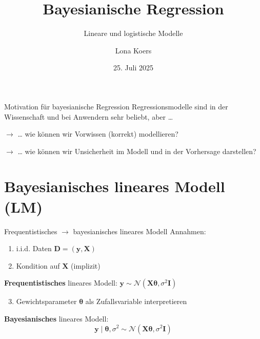 \documentclass[
  ignorenonframetext,
  aspectratio=169,
]{beamer}
\title{Bayesianische Regression}
\subtitle{Lineare und logistische Modelle}
\author{Lona Koers}
\date{25. Juli 2025}
\institute{LMU}
\providecommand{\tightlist}{%
  \setlength{\itemsep}{0pt}\setlength{\parskip}{0pt}}
\newcommand{\by}{\bm{y}}
\newcommand{\bD}{\bm{D}}
\newcommand{\bI}{\bm{I}}
\newcommand{\bX}{\bm{X}}
\newcommand{\Ncal}{\mathcal{N}}
\newcommand{\ssd}{\sigma^2}
\newcommand{\btheta}{\bm{\theta}}
\begin{document}
\frame{\titlepage}

\begin{frame}{Motivation für bayesianische Regression}
\protect{}\label{motivation-fuxfcr-bayesianische-regression}
Regressionsmodelle sind in der Wissenschaft und bei Anwendern sehr
beliebt, aber \ldots{}

\vspace{0.5cm}

\(\to\) \ldots{} wie können wir Vorwissen (korrekt) modellieren?

\(\to\) \ldots{} wie können wir Unsicherheit im Modell und in der
Vorhersage darstellen?
\end{frame}

\section{\texorpdfstring{Bayesianisches \textbf{lineares} Modell
(LM)}{Bayesianisches lineares Modell (LM)}}\label{bayesianisches-lineares-modell-lm}

\begin{frame}{Frequentistisches \(\to\) bayesianisches lineares Modell}
\protect{}\label{frequentistisches-to-bayesianisches-lineares-modell}
Annahmen:

\begin{enumerate}
\tightlist
\item
  i.i.d. Daten \(\bD = (\by, \bX)\)
\item
  Kondition auf \(\bX\) (implizit)
\end{enumerate}

\textbf{Frequentistisches} lineares Modell:
\(\by \sim \Ncal(\bX \btheta, \ssd \bI)\)

\begin{enumerate}
\setcounter{enumi}{2}
\tightlist
\item
  Gewichtsparameter \(\btheta\) als Zufallsvariable interpretieren
\end{enumerate}

\vspace{0.5cm}

\begin{block}{\textbf{Bayesianisches} lineares Modell:}
\protect{}\label{bayesianisches-lineares-modell}
\[\by \mid \btheta, \ssd \sim \Ncal(\bX \btheta, \ssd \bI)\]
\end{block}
\end{frame}
\end{document}
